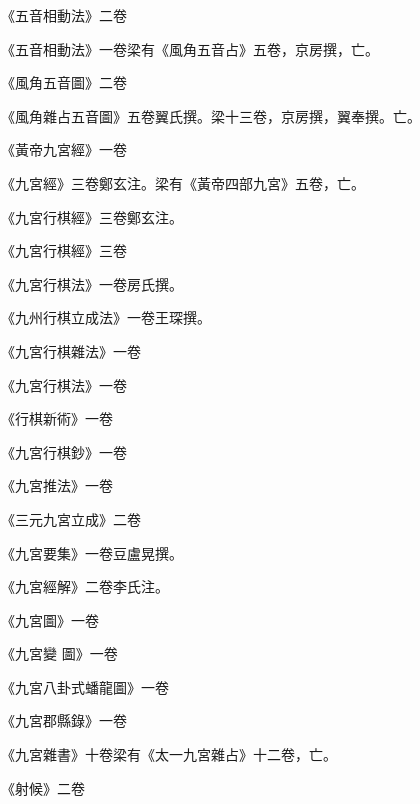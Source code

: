 \begin{pinyinscope}
 《五音相動法》二卷



 《五音相動法》一卷梁有《風角五音占》五卷，京房撰，亡。



 《風角五音圖》二卷



 《風角雜占五音圖》五卷翼氏撰。梁十三卷，京房撰，翼奉撰。亡。



 《黃帝九宮經》一卷



 《九宮經》三卷鄭玄注。梁有《黃帝四部九宮》五卷，亡。



 《九宮行棋經》三卷鄭玄注。



 《九宮行棋經》三卷



 《九宮行棋法》一卷房氏撰。



 《九州行棋立成法》一卷王琛撰。



 《九宮行棋雜法》一卷



 《九宮行棋法》一卷



 《行棋新術》一卷



 《九宮行棋鈔》一卷



 《九宮推法》一卷



 《三元九宮立成》二卷



 《九宮要集》一卷豆盧晃撰。



 《九宮經解》二卷李氏注。



 《九宮圖》一卷



 《九宮變
 圖》一卷



 《九宮八卦式蟠龍圖》一卷



 《九宮郡縣錄》一卷



 《九宮雜書》十卷梁有《太一九宮雜占》十二卷，亡。



 《射候》二卷




\end{pinyinscope}
